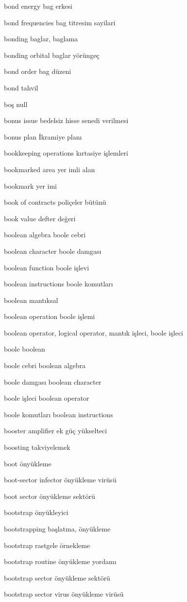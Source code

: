 \documentclass[12pt,fleqn]{article}\usepackage{../../common}
\begin{document}
bond energy bag erkesi

bond frequencies bag titresim sayilari

bonding baglar, baglama

bonding orbital baglar yörüngeç

bond order bag düzeni

bond tahvil

boş null

bonus issue bedelsiz hisse senedi verilmesi

bonus plan İkramiye planı

bookkeeping operations kırtasiye işlemleri

bookmarked area yer imli alan

bookmark yer imi

book of contracts poliçeler bütünü

book value defter değeri

boolean algebra boole cebri

boolean character boole damgası

boolean function boole işlevi

boolean instructions boole komutları

boolean mantıksal

boolean operation boole işlemi

boolean operator, logical operator, mantık işleci, boole işleci

boole boolean

boole cebri boolean algebra

boole damgası boolean character

boole işleci boolean operator

boole komutları boolean instructions

booster amplifier ek güç yükselteci

boosting takviyelemek

boot önyükleme

boot-sector infector önyükleme virüsü

boot sector önyükleme sektörü

bootstrap önyükleyici

bootstrapping başlatma, önyükleme

bootstrap rastgele örnekleme

bootstrap routine önyükleme yordamı

bootstrap sector önyükleme sektörü

bootstrap sector virus önyükleme virüsü
\end{document}

